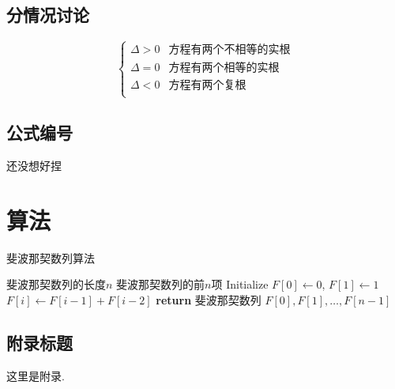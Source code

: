 \documentclass[12pt, a4paper, oneside]{ctexart}
\begin{document}
\subsection{分情况讨论}

$$
    \begin{cases}
        \Delta >0 & \text{方程有两个不相等的实根} \\
        \Delta =0 & \text{方程有两个相等的实根}  \\
        \Delta <0 & \text{方程有两个复根}     \\
    \end{cases}
$$
\subsection{公式编号}
还没想好捏

\section{算法}

\begin{algorithm}
    \renewcommand{\algorithmicrequire}{\textbf{Input:}}
    \renewcommand{\algorithmicensure}{\textbf{Output:}}
    \caption{斐波那契数列算法}
    \label{alg:fibonacci}
    \begin{algorithmic}[1]
        \REQUIRE  斐波那契数列的长度$n$
        \ENSURE 斐波那契数列的前$n$项
        \STATE Initialize $F[0] \gets 0$, $F[1] \gets 1$
        \STATE $F[i] \gets F[i-1] + F[i-2]$
        \ENDFOR
        \STATE \textbf{return} 斐波那契数列 $F[0], F[1], \ldots, F[n-1]$
    \end{algorithmic}
\end{algorithm}


\newpage

\printbibliography[title=参考文献]

\begin{appendices}
    \renewcommand{\thesection}{\Alph{section}}
    \section{附录标题}
    这里是附录.
\end{appendices}
\end{document}

